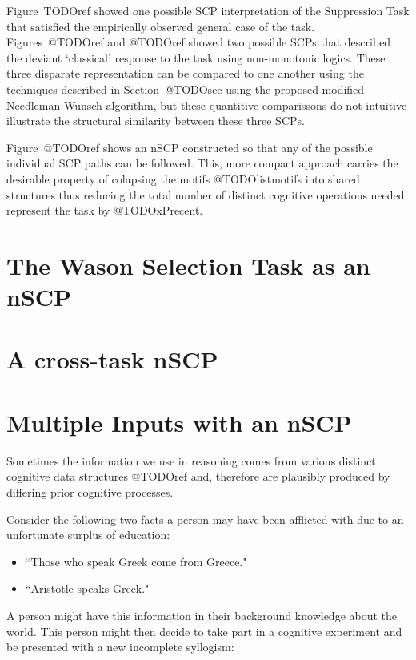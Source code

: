 Figure~TODOref showed one possible SCP interpretation of the Suppression Task that satisfied the empirically observed general case of the task. Figures~@TODOref and @TODOref showed two possible SCPs that described the deviant `classical' response to the task using non-monotonic logics. These three disparate representation can be compared to one another using the techniques described in Section~@TODOsec using the proposed modified Needleman-Wunsch algorithm, but these quantitive comparissons do not intuitive illustrate the structural similarity between these three SCPs.

Figure~@TODOref shows an nSCP constructed so that any of the possible individual SCP paths can be followed. This, more compact approach carries the desirable property of colapsing the motifs @TODOlistmotifs into shared structures thus reducing the total number of distinct cognitive operations needed represent the task by @TODOxPrecent. 

\section{The Wason Selection Task as an nSCP}


\section{A cross-task nSCP}

\section{Multiple Inputs with an nSCP}
Sometimes the information we use in reasoning comes from various distinct cognitive data structures @TODOref and, therefore are plausibly produced by differing prior cognitive processes.

Consider the following two facts a person may have been afflicted with due to an unfortunate surplus of education:
\begin{itemize}
\item ``Those who speak Greek come from Greece."
\item ``Aristotle speaks Greek."
\end{itemize}



A person might have this information in their background knowledge about the world.  This person might then decide to take part in a cognitive experiment and be presented with a new incomplete syllogism:

